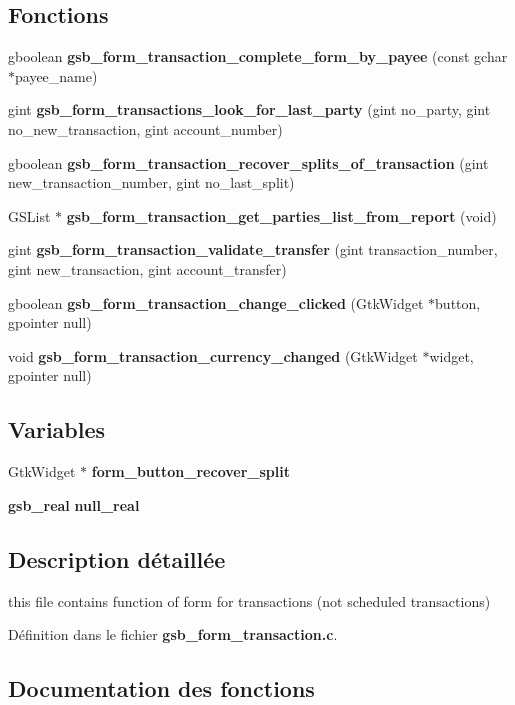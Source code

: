 \subsection*{Fonctions}
\begin{DoxyCompactItemize}
\item 
gboolean {\bf gsb\_\-form\_\-transaction\_\-complete\_\-form\_\-by\_\-payee} (const gchar $\ast$payee\_\-name)
\item 
gint {\bf gsb\_\-form\_\-transactions\_\-look\_\-for\_\-last\_\-party} (gint no\_\-party, gint no\_\-new\_\-transaction, gint account\_\-number)
\item 
gboolean {\bf gsb\_\-form\_\-transaction\_\-recover\_\-splits\_\-of\_\-transaction} (gint new\_\-transaction\_\-number, gint no\_\-last\_\-split)
\item 
GSList $\ast$ {\bf gsb\_\-form\_\-transaction\_\-get\_\-parties\_\-list\_\-from\_\-report} (void)
\item 
gint {\bf gsb\_\-form\_\-transaction\_\-validate\_\-transfer} (gint transaction\_\-number, gint new\_\-transaction, gint account\_\-transfer)
\item 
gboolean {\bf gsb\_\-form\_\-transaction\_\-change\_\-clicked} (GtkWidget $\ast$button, gpointer null)
\item 
void {\bf gsb\_\-form\_\-transaction\_\-currency\_\-changed} (GtkWidget $\ast$widget, gpointer null)
\end{DoxyCompactItemize}
\subsection*{Variables}
\begin{DoxyCompactItemize}
\item 
GtkWidget $\ast$ {\bf form\_\-button\_\-recover\_\-split}
\item 
{\bf gsb\_\-real} {\bf null\_\-real}
\end{DoxyCompactItemize}


\subsection{Description détaillée}
this file contains function of form for transactions (not scheduled transactions) 

Définition dans le fichier {\bf gsb\_\-form\_\-transaction.c}.



\subsection{Documentation des fonctions}
